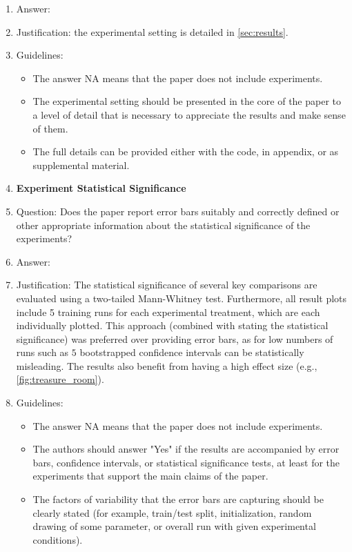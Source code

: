 \documentclass{article}
\begin{document}
\begin{enumerate}
    \item[] Answer: \answerYes{}
    \item[] Justification: the experimental setting is detailed in \cref{sec:results}.
    \item[] Guidelines:
    \begin{itemize}
        \item The answer NA means that the paper does not include experiments.
        \item The experimental setting should be presented in the core of the paper to a level of detail that is necessary to appreciate the results and make sense of them.
        \item The full details can be provided either with the code, in appendix, or as supplemental material.
    \end{itemize}
\item {\bf Experiment Statistical Significance}
    \item[] Question: Does the paper report error bars suitably and correctly defined or other appropriate information about the statistical significance of the experiments?
    \item[] Answer:
    \answerYes{}
    \item[] Justification: The statistical significance of several key comparisons are evaluated using a two-tailed Mann-Whitney test. Furthermore, all result plots include 5 training runs for each experimental treatment, which are each individually plotted. This approach (combined with stating the statistical significance) was preferred over providing error bars, as for low numbers of runs such as \(5\) bootstrapped confidence intervals can be statistically misleading. The results also benefit from having a high effect size (e.g., \ref{fig:treasure_room}).
    \item[] Guidelines:
    \begin{itemize}
        \item The answer NA means that the paper does not include experiments.
        \item The authors should answer "Yes" if the results are accompanied by error bars, confidence intervals, or statistical significance tests, at least for the experiments that support the main claims of the paper.
        \item The factors of variability that the error bars are capturing should be clearly stated (for example, train/test split, initialization, random drawing of some parameter, or overall run with given experimental conditions).

\end{itemize}
\end{enumerate}
\end{document}
